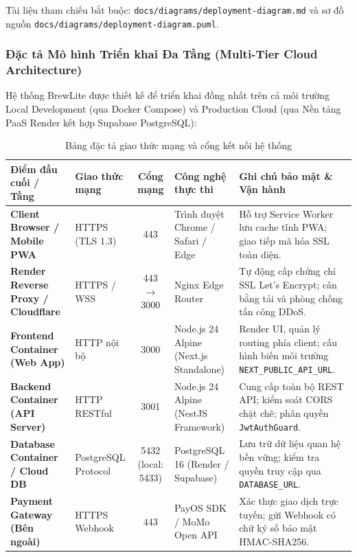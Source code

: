 \documentclass[11pt,a4paper]{article}
\begin{document}
Tài liệu tham chiếu bắt buộc: \texttt{docs/diagrams/deployment-diagram.md} và sơ đồ nguồn \texttt{docs/diagrams/deployment-diagram.puml}.

\subsubsection{Đặc tả Mô hình Triển khai Đa Tầng (Multi-Tier Cloud Architecture)}
Hệ thống BrewLite được thiết kế để triển khai đồng nhất trên cả môi trường Local Development (qua Docker Compose) và Production Cloud (qua Nền tảng PaaS Render kết hợp Supabase PostgreSQL):

\begin{table}[H]
\centering
\small
\renewcommand{\arraystretch}{0.90}
\begin{tabularx}{\linewidth}{|p{3.2cm}|p{2.2cm}|c|p{2.6cm}|Y|}
\hline
{}
\textbf{Điểm đầu cuối / Tầng} & \textbf{Giao thức mạng} & \textbf{Cổng mạng} & \textbf{Công nghệ thực thi} & \textbf{Ghi chú bảo mật \& Vận hành} \\ \hline
\textbf{Client Browser / Mobile PWA} & HTTPS (TLS 1.3) & 443 & Trình duyệt Chrome / Safari / Edge & Hỗ trợ Service Worker lưu cache tĩnh PWA; giao tiếp mã hóa SSL toàn diện. \\ \hline
\textbf{Render Reverse Proxy / Cloudflare} & HTTPS / WSS & 443 $\rightarrow$ 3000 & Nginx Edge Router & Tự động cấp chứng chỉ SSL Let's Encrypt; cân bằng tải và phòng chống tấn công DDoS. \\ \hline
\textbf{Frontend Container (Web App)} & HTTP nội bộ & 3000 & Node.js 24 Alpine (Next.js Standalone) & Render UI, quản lý routing phía client; cấu hình biến môi trường \texttt{NEXT\_PUBLIC\_API\_URL}. \\ \hline
\textbf{Backend Container (API Server)} & HTTP RESTful & 3001 & Node.js 24 Alpine (NestJS Framework) & Cung cấp toàn bộ REST API; kiểm soát CORS chặt chẽ; phân quyền \texttt{JwtAuthGuard}. \\ \hline
\textbf{Database Container / Cloud DB} & PostgreSQL Protocol & 5432 (local: 5433) & PostgreSQL 16 (Render / Supabase) & Lưu trữ dữ liệu quan hệ bền vững; kiểm tra quyền truy cập qua \texttt{DATABASE\_URL}. \\ \hline
\textbf{Payment Gateway (Bên ngoài)} & HTTPS Webhook & 443 & PayOS SDK / MoMo Open API & Xác thực giao dịch trực tuyến; gửi Webhook có chữ ký số bảo mật HMAC-SHA256. \\ \hline
\end{tabularx}
\caption{Bảng đặc tả giao thức mạng và cổng kết nối hệ thống}
\label{tab:ports}
\end{table}
\end{document}
